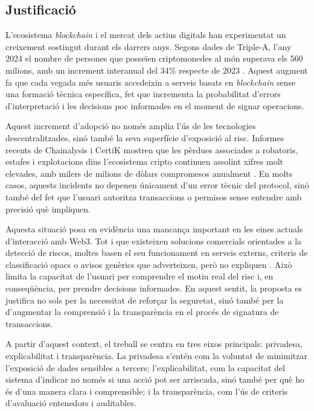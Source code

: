 \newpage

\subsection{Justificació}

L’ecosistema \textit{blockchain} i el mercat dels actius digitals han experimentat un creixement sostingut durant els darrers anys. Segons dades de Triple-A, l’any 2024 el nombre de persones que posseïen criptomonedes al món superava els 560 milions, amb un increment interanual del 34\% respecte de 2023 \cite{triplea_ownership_2024}. Aquest augment fa que cada vegada més usuaris accedeixin a serveis basats en \textit{blockchain} sense una formació tècnica específica, fet que incrementa la probabilitat d’errors d’interpretació i les decisions poc informades en el moment de signar operacions.

Aquest increment d’adopció no només amplia l’ús de les tecnologies descentralitzades, sinó també la seva superfície d’exposició al risc. Informes recents de Chainalysis i CertiK mostren que les pèrdues associades a robatoris, estafes i explotacions dins l’ecosistema cripto continuen assolint xifres molt elevades, amb milers de milions de dòlars compromesos anualment \cite{chainalysis_stolen_2024,chainalysis_2025_report_intro,certik_hack3d_2024}. En molts casos, aquests incidents no depenen únicament d’un error tècnic del protocol, sinó també del fet que l’usuari autoritza transaccions o permisos sense entendre amb precisió què impliquen.

Aquesta situació posa en evidència una mancança important en les eines actuals d’interacció amb Web3. Tot i que existeixen solucions comercials orientades a la detecció de riscos, moltes basen el seu funcionament en serveis externs, criteris de classificació opacs o avisos genèrics que adverteixen, però no expliquen \cite{metamask_tx_insights,consensys_snaps_launch}. Això limita la capacitat de l’usuari per comprendre el motiu real del risc i, en conseqüència, per prendre decisions informades. En aquest sentit, la proposta es justifica no sols per la necessitat de reforçar la seguretat, sinó també per la d’augmentar la comprensió i la transparència en el procés de signatura de transaccions.

A partir d’aquest context, el treball se centra en tres eixos principals: privadesa, explicabilitat i transparència. La privadesa s’entén com la voluntat de minimitzar l’exposició de dades sensibles a tercers; l’explicabilitat, com la capacitat del sistema d’indicar no només si una acció pot ser arriscada, sinó també per què ho és d’una manera clara i comprensible; i la transparència, com l’ús de criteris d’avaluació entenedors i auditables.

